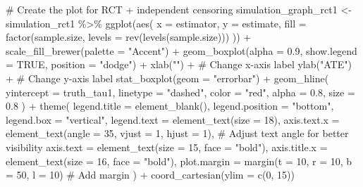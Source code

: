 \documentclass[
  11pt,
  a4paper,
]{article}
\newenvironment{Shaded}{}{}
\newcommand{\AttributeTok}[1]{\textcolor[rgb]{0.84,0.23,0.29}{#1}}
\newcommand{\CommentTok}[1]{\textcolor[rgb]{0.42,0.45,0.49}{#1}}
\newcommand{\ConstantTok}[1]{\textcolor[rgb]{0.00,0.36,0.77}{#1}}
\newcommand{\DecValTok}[1]{\textcolor[rgb]{0.00,0.36,0.77}{#1}}
\newcommand{\FloatTok}[1]{\textcolor[rgb]{0.00,0.36,0.77}{#1}}
\newcommand{\FunctionTok}[1]{\textcolor[rgb]{0.44,0.26,0.76}{#1}}
\newcommand{\NormalTok}[1]{\textcolor[rgb]{0.14,0.16,0.18}{#1}}
\newcommand{\OtherTok}[1]{\textcolor[rgb]{0.44,0.26,0.76}{#1}}
\newcommand{\SpecialCharTok}[1]{\textcolor[rgb]{0.00,0.36,0.77}{#1}}
\newcommand{\StringTok}[1]{\textcolor[rgb]{0.01,0.18,0.38}{#1}}
\theoremstyle{plain}
\theoremstyle{plain}
\theoremstyle{plain}
\theoremstyle{definition}
\theoremstyle{remark}
\begin{document}
\begin{Shaded}
\begin{Highlighting}[]
\CommentTok{\# Create the plot for RCT + independent censoring}
\NormalTok{simulation\_graph\_rct1 }\OtherTok{\textless{}{-}}\NormalTok{ simulation\_rct1 }\SpecialCharTok{\%\textgreater{}\%}
  \FunctionTok{ggplot}\NormalTok{(}\FunctionTok{aes}\NormalTok{(}
    \AttributeTok{x =}\NormalTok{ estimator, }\AttributeTok{y =}\NormalTok{ estimate,  }
    \AttributeTok{fill =} \FunctionTok{factor}\NormalTok{(sample.size, }\AttributeTok{levels =} \FunctionTok{rev}\NormalTok{(}\FunctionTok{levels}\NormalTok{(sample.size)))}
\NormalTok{  )) }\SpecialCharTok{+}
  \FunctionTok{scale\_fill\_brewer}\NormalTok{(}\AttributeTok{palette =} \StringTok{"Accent"}\NormalTok{) }\SpecialCharTok{+}
  \FunctionTok{geom\_boxplot}\NormalTok{(}\AttributeTok{alpha =} \FloatTok{0.9}\NormalTok{, }\AttributeTok{show.legend =} \ConstantTok{TRUE}\NormalTok{, }\AttributeTok{position =} \StringTok{"dodge"}\NormalTok{) }\SpecialCharTok{+}
  \FunctionTok{xlab}\NormalTok{(}\StringTok{""}\NormalTok{) }\SpecialCharTok{+}  \CommentTok{\# Change x{-}axis label}
  \FunctionTok{ylab}\NormalTok{(}\StringTok{"ATE"}\NormalTok{) }\SpecialCharTok{+}  \CommentTok{\# Change y{-}axis label}
  \FunctionTok{stat\_boxplot}\NormalTok{(}\AttributeTok{geom =} \StringTok{"errorbar"}\NormalTok{) }\SpecialCharTok{+}
  \FunctionTok{geom\_hline}\NormalTok{(}
    \AttributeTok{yintercept =}\NormalTok{ truth\_tau1, }\AttributeTok{linetype =} \StringTok{"dashed"}\NormalTok{, }\AttributeTok{color =} \StringTok{"red"}\NormalTok{, }
    \AttributeTok{alpha =} \FloatTok{0.8}\NormalTok{, }\AttributeTok{size =} \FloatTok{0.8}
\NormalTok{  ) }\SpecialCharTok{+}
\FunctionTok{theme}\NormalTok{(}
    \AttributeTok{legend.title =} \FunctionTok{element\_blank}\NormalTok{(), }\AttributeTok{legend.position =} \StringTok{"bottom"}\NormalTok{,}
    \AttributeTok{legend.box =} \StringTok{"vertical"}\NormalTok{, }\AttributeTok{legend.text =} \FunctionTok{element\_text}\NormalTok{(}\AttributeTok{size =} \DecValTok{18}\NormalTok{),}
    \AttributeTok{axis.text.x =} \FunctionTok{element\_text}\NormalTok{(}\AttributeTok{angle =} \DecValTok{35}\NormalTok{, }\AttributeTok{vjust =} \DecValTok{1}\NormalTok{, }\AttributeTok{hjust =} \DecValTok{1}\NormalTok{),  }
    \CommentTok{\# Adjust text angle for better visibility}
    \AttributeTok{axis.text =} \FunctionTok{element\_text}\NormalTok{(}\AttributeTok{size =} \DecValTok{15}\NormalTok{, }\AttributeTok{face =} \StringTok{"bold"}\NormalTok{),}
    \AttributeTok{axis.title.x =} \FunctionTok{element\_text}\NormalTok{(}\AttributeTok{size =} \DecValTok{16}\NormalTok{, }\AttributeTok{face =} \StringTok{"bold"}\NormalTok{),}
    \AttributeTok{plot.margin =} \FunctionTok{margin}\NormalTok{(}\AttributeTok{t =} \DecValTok{10}\NormalTok{, }\AttributeTok{r =} \DecValTok{10}\NormalTok{, }\AttributeTok{b =} \DecValTok{50}\NormalTok{, }\AttributeTok{l =} \DecValTok{10}\NormalTok{)  }\CommentTok{\# Add margin}
\NormalTok{  ) }\SpecialCharTok{+}    
  \FunctionTok{coord\_cartesian}\NormalTok{(}\AttributeTok{ylim =} \FunctionTok{c}\NormalTok{(}\DecValTok{0}\NormalTok{, }\DecValTok{15}\NormalTok{))}
\end{Highlighting}
\end{Shaded}
\end{document}
